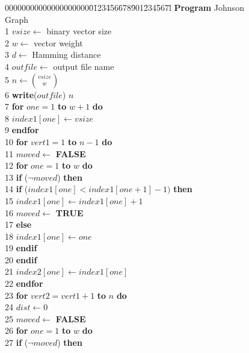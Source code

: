\begin{figure}
{\scriptsize
\begin{tabbing}
00000000000000000000\=0\=123\=456\=678\=901\=234\=567\=l \+ \+ \kill
 \< {\bf Program} Johnson Graph \\
 1 \> $vsize \leftarrow$  binary vector size \\
 2 \> $w \leftarrow$ vector weight \\
 3 \> $d \leftarrow$ Hamming distance \\
 4 \> $outfile \leftarrow$ output file name \\
 5 \> $n \leftarrow {vsize \choose w}$ \\
 6 \> {\bf write}($outfile$)  $n$ \\
 7 \> {\bf for} $one = 1$ {\bf to} $w+1$ {\bf do}   \\
 8 \> \> $index1[one] \leftarrow vsize$ \\
 9 \> {\bf endfor} \- \\
10 \> \> {\bf for} $vert1 = 1$ {\bf to} $n-1$ {\bf do} \\
11 \> \> \> $moved \leftarrow$ {\bf FALSE} \\
12 \> \> \> {\bf for} $one = 1$ {\bf to} $w$ {\bf do} \\
13 \> \> \> \> {\bf if} ($\neg moved$) {\bf then} \\
14 \> \> \> \> \> {\bf if} ($index1[one] < index1[one+1]-1)$ {\bf then} \\
15 \> \> \> \> \> \> $index1[one] \leftarrow index1[one]+1$ \\ 
16 \> \> \> \> \> \> $moved \leftarrow$ {\bf TRUE} \\
17 \> \> \> \> \> {\bf else} \\
18 \> \> \> \> \> \> $index1[one] \leftarrow one$ \\
19 \> \> \> \> \> {\bf endif} \\
20 \> \> \> \> {\bf endif} \\
21 \> \> \> \> $index2[one] \leftarrow index1[one]$ \\
22 \> \> \> {\bf endfor} \\
23 \> \> \> {\bf for} $vert2 = vert1+1$ {\bf to} $n$ {\bf do} \\
24 \> \> \> \> $dist \leftarrow 0$ \\
25 \> \> \> \> $moved \leftarrow$ {\bf FALSE} \\
26 \> \> \> \> {\bf for} $one = 1$ {\bf to} $w$ {\bf do} \\
27 \> \> \> \> \> {\bf if} ($\neg moved$) {\bf then} \\

\end{tabbing}}
\end{figure}

